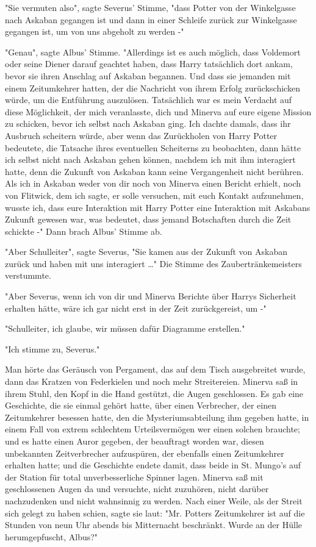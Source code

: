 {"Sie vermuten also", sagte Severus' Stimme, "dass Potter von der Winkelgasse nach Askaban gegangen ist und dann in einer Schleife zurück zur Winkelgasse gegangen ist, um von uns abgeholt zu werden -"

"Genau", sagte Albus' Stimme. "Allerdings ist es auch möglich, dass Voldemort oder seine Diener darauf geachtet haben, dass Harry tatsächlich dort ankam, bevor sie ihren Anschlag auf Askaban begannen. Und dass sie jemanden mit einem Zeitumkehrer hatten, der die Nachricht von ihrem Erfolg zurückschicken würde, um die Entführung auszulösen. Tatsächlich war es mein Verdacht auf diese Möglichkeit, der mich veranlasste, dich und Minerva auf eure eigene Mission zu schicken, bevor ich selbst nach Askaban ging. Ich dachte damals, dass ihr Ausbruch scheitern würde, aber wenn das Zurückholen von Harry Potter bedeutete, die Tatsache ihres eventuellen Scheiterns zu beobachten, dann hätte ich selbst nicht nach Askaban gehen können, nachdem ich mit ihm interagiert hatte, denn die Zukunft von Askaban kann seine Vergangenheit nicht berühren. Als ich in Askaban weder von dir noch von Minerva einen Bericht erhielt, noch von Flitwick, dem ich sagte, er solle versuchen, mit euch Kontakt aufzunehmen, wusste ich, dass eure Interaktion mit Harry Potter eine Interaktion mit Askabans Zukunft gewesen war, was bedeutet, dass jemand Botschaften durch die Zeit schickte -" Dann brach Albus' Stimme ab.

"Aber Schulleiter", sagte Severus, "Sie kamen aus der Zukunft von Askaban zurück und haben mit uns interagiert …" Die Stimme des Zaubertränkemeisters verstummte.

"Aber Severus, wenn ich von dir und Minerva Berichte über Harrys Sicherheit erhalten hätte, wäre ich gar nicht erst in der Zeit zurückgereist, um -"

"Schulleiter, ich glaube, wir müssen dafür Diagramme erstellen."

"Ich stimme zu, Severus."

Man hörte das Geräusch von Pergament, das auf dem Tisch ausgebreitet wurde, dann das Kratzen von Federkielen und noch mehr Streitereien. Minerva saß in ihrem Stuhl, den Kopf in die Hand gestützt, die Augen geschlossen. Es gab eine Geschichte, die sie einmal gehört hatte, über einen Verbrecher, der einen Zeitumkehrer besessen hatte, den die Mysteriumsabteilung ihm gegeben hatte, in einem Fall von extrem schlechtem Urteilsvermögen wer einen solchen brauchte; und es hatte einen Auror gegeben, der beauftragt worden war, diesen unbekannten Zeitverbrecher aufzuspüren, der ebenfalls einen Zeitumkehrer erhalten hatte; und die Geschichte endete damit, dass beide in St. Mungo's auf der Station für total unverbesserliche Spinner lagen. Minerva saß mit geschlossenen Augen da und versuchte, nicht zuzuhören, nicht darüber nachzudenken und nicht wahnsinnig zu werden. Nach einer Weile, als der Streit sich gelegt zu haben schien, sagte sie laut: "Mr. Potters Zeitumkehrer ist auf die Stunden von neun Uhr abends bis Mitternacht beschränkt. Wurde an der Hülle herumgepfuscht, Albus?"

}
